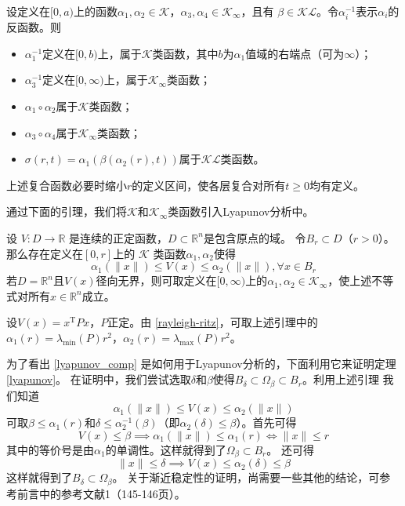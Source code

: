 \begin{lemma}
  设定义在$[0,a)$上的函数$\alpha_{1},\alpha_{2}\in\mathcal{K}$，$\alpha_{3},\alpha_{4}\in\mathcal{K}_{\infty}$，且有
  $\beta\in\mathcal{KL}$。令$\alpha_{i}^{-1}$表示$\alpha_{i}$的反函数。则
  \begin{itemize}[leftmargin=1em]
    \item $\alpha_{1}^{-1}$定义在$[0,b)$上，属于$\mathcal{K}$类函数，其中$b$为$\alpha_1$值域的右端点（可为$\infty$）；
    \item $\alpha_{3}^{-1}$定义在$[0,\infty)$上，属于$\mathcal{K}_\infty$类函数；
    \item $\alpha_{1} \circ\alpha_{2}$属于$\mathcal{K}$类函数；
    \item $\alpha_{3} \circ\alpha_{4}$属于$\mathcal{K}_\infty$类函数；
    \item $\sigma(r,t)=\alpha_{1}(\beta(\alpha_{2}(r),t)) $属于$\mathcal{K}\mathcal{L}$类函数。
  \end{itemize}
  上述复合函数必要时缩小$r$的定义区间，使各层复合对所有$t\ge0$均有定义。
\end{lemma}

通过下面的引理，我们将$\mathcal{K}$和$\mathcal{K}_\infty$类函数引入Lyapunov分析中。

\begin{lemma}\label{lyapunov_comp}
 设 $V : D \rightarrow \mathbb{R}$ 是连续的正定函数，$D\subset\mathbb{R}^n$是包含原点的域。
  令$B_r\subset D$（$r>0$）。那么存在定义在$[0,r]$上的
  $\mathcal{K}$ 类函数$\alpha_1,\alpha_2$使得
  \[ \alpha_1 (\| x \|) \leq V (x) \leq \alpha_2 (\| x \|), \forall x \in B_r \]
  若$D=\mathbb{R}^n$且$V(x)$径向无界，则可取定义在$[0,\infty)$上的$\alpha_1,\alpha_2\in\mathcal{K}_\infty$，使上述不等式对所有$x\in\mathbb{R}^n$成立。
\end{lemma}

\begin{example}
  设$V (x) = x^\mathrm{T} P  x$，$P$正定。由 \ref{rayleigh-ritz}，可取上述引理中的$\alpha_1(r)=\lambda_{\min} (P)r^2$，$\alpha_2(r)=\lambda_{\max} (P)r^2$。
\end{example}
为了看出 \ref{lyapunov_comp} 是如何用于Lyapunov分析的，下面利用它来证明定理 \ref{lyapunov}。
在证明中，我们尝试选取$\delta$和$\beta$使得$B_\delta\subset\Omega_\beta\subset B_r$。利用上述引理
我们知道\[\alpha_1 (\| x \|) \leq V (x) \leq \alpha_2 (\| x \|)\]
可取$\beta\le\alpha_1(r)$和$\delta\le\alpha_2^{-1}(\beta)$（即$\alpha_2(\delta)\le\beta$）。首先可得
\[V(x)\le\beta\implies\alpha_1(\|x\|)\le\alpha_1(r)\iff \|x\|\le r\]
其中的等价号是由$\alpha_1$的单调性。这样就得到了$\Omega_\beta\subset B_r$。
还可得\[\|x\|\le\delta\implies V(x)\le\alpha_2(\delta)\le\beta\]
这样就得到了$B_\delta\subset\Omega_\beta$。
关于渐近稳定性的证明，尚需要一些其他的结论，可参考前言中的参考文献1（145-146页）。

